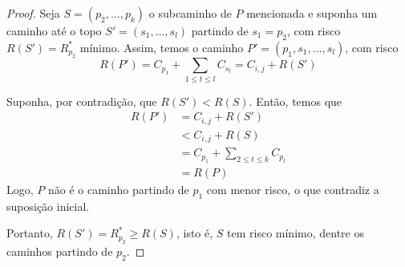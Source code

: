 \begin{proof}
    Seja $S = \left(p_2, \ldots, p_k\right)$ o subcaminho de $P$ mencionada e suponha um caminho até o topo $S' = \left(s_1, \ldots, s_l\right)$ partindo de $s_1 = p_2$, com risco $R(S') = R^*_{p_2}$ mínimo. Assim, temos o caminho $P' = \left(p_1, s_1, \ldots, s_l\right)$, com risco
    \[
        R(P') = C_{p_1} + \sum_{1 \leq t \leq l} C_{s_t} = C_{i,j} + R(S')
    \]

    Suponha, por contradição, que $R(S') < R(S)$. Então, temos que
    \begin{align*}
        R(P') &= C_{i,j} + R(S')  \\
            &< C_{i,j} + R(S) \\
            &= C_{p_1} + \sum_{2 \leq t \leq k} C_{p_t} \\
            &= R(P)
    \end{align*}
    Logo, $P$ não é o caminho partindo de $p_1$ com menor risco, o que contradiz a suposição inicial.

    Portanto, $R(S') = R^*_{p_2} \geq R(S)$, isto é, $S$ tem risco mínimo, dentre os caminhos partindo de $p_2$.
\end{proof}
